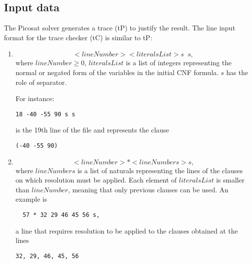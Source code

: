 \documentclass[a4paper,12pt]{article}
\begin{document}
\subsection{Input data}
The Picosat solver generates a trace (tP) to justify the result. The line input format for the trace checker (tC) is similar 
to tP:
\begin{enumerate}
 \item 
\begin{equation}
 <lineNumber><literalsList>s \;\; s, 
\end{equation} where $lineNumber \ge 0$, $ literalsList $ is a list of integers representing the normal or negated form of the variables in the 
initial CNF formula. 
$ s $ has the role of separator.

For instance: 
\begin{verbatim}18 -40 -55 90 s s\end{verbatim}
   is the 19th line of the file and represents the clause \begin{verbatim}(-40 -55 90)\end{verbatim}
\item
\begin{equation}
 <lineNumber>*<lineNumbers>s,
\end{equation}
where $ lineNumbers $ is a list of naturals representing the lines of the clauses on which resolution must be applied. 
Each element of $ literalsList$ is smaller than $ lineNumber $, meaning that only previous clauses can be used. An example is 
\begin{verbatim}
  57 * 32 29 46 45 56 s,
\end{verbatim} a line that requires resolution to be applied to the clauses obtained at the lines 
\begin{verbatim}32, 29, 46, 45, 56\end{verbatim}

\end{enumerate}
\end{document}
